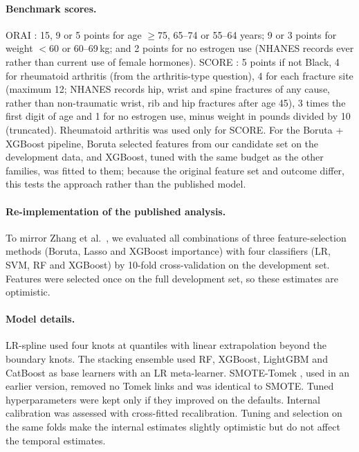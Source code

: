 \documentclass[11pt,a4paper]{article}
\begin{document}
\paragraph{Benchmark scores.} ORAI \cite{cadarette2000}: 15, 9 or 5 points for age $\ge$75, 65--74 or 55--64 years; 9 or 3 points for weight $<$60 or 60--69\,kg; and 2 points for no estrogen use (NHANES records ever rather than current use of female hormones). SCORE \cite{lydick1998}: 5 points if not Black, 4 for rheumatoid arthritis (from the arthritis-type question), 4 for each fracture site (maximum 12; NHANES records hip, wrist and spine fractures of any cause, rather than non-traumatic wrist, rib and hip fractures after age 45), 3 times the first digit of age and 1 for no estrogen use, minus weight in pounds divided by 10 (truncated). Rheumatoid arthritis was used only for SCORE. For the Boruta + XGBoost pipeline, Boruta \cite{kursa2010} selected features from our candidate set on the development data, and XGBoost, tuned with the same budget as the other families, was fitted to them; because the original feature set and outcome differ, this tests the approach rather than the published model.

\paragraph{Re-implementation of the published analysis.} To mirror Zhang et al.\ \cite{zhang2025}, we evaluated all combinations of three feature-selection methods (Boruta, Lasso \cite{tibshirani1996} and XGBoost importance) with four classifiers (LR, SVM, RF and XGBoost) by 10-fold cross-validation on the development set. Features were selected once on the full development set, so these estimates are optimistic.

\paragraph{Model details.} LR-spline used four knots at quantiles with linear extrapolation beyond the boundary knots. The stacking ensemble used RF, XGBoost, LightGBM and CatBoost as base learners with an LR meta-learner. SMOTE-Tomek \cite{batista2004}, used in an earlier version, removed no Tomek links and was identical to SMOTE. Tuned hyperparameters were kept only if they improved on the defaults. Internal calibration was assessed with cross-fitted recalibration. Tuning and selection on the same folds make the internal estimates slightly optimistic but do not affect the temporal estimates.
\end{document}
